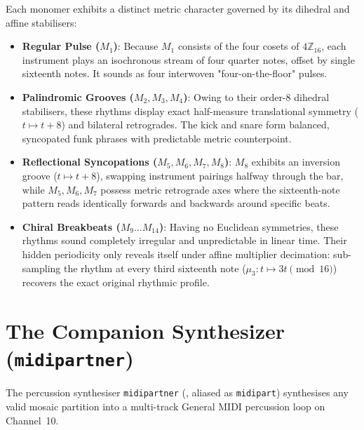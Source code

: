 Each monomer exhibits a distinct metric character governed by its dihedral and affine stabilisers:
\begin{itemize}
    \item \textbf{Regular Pulse ($M_1$)}:
    Because $M_1$ consists of the four cosets of $4\mathbb{Z}_{16}$, each instrument plays an isochronous stream of four quarter notes, offset by single sixteenth notes. It sounds as four interwoven "four-on-the-floor" pulses.
    
    \item \textbf{Palindromic Grooves ($M_2, M_3, M_4$)}:
    Owing to their order-$8$ dihedral stabilisers, these rhythms display exact half-measure translational symmetry ($t \mapsto t + 8$) and bilateral retrogrades. The kick and snare form balanced, syncopated funk phrases with predictable metric counterpoint.
    
    \item \textbf{Reflectional Syncopations ($M_5, M_6, M_7, M_8$)}:
    $M_8$ exhibits an inversion groove ($t \mapsto t + 8$), swapping instrument pairings halfway through the bar, while $M_5, M_6, M_7$ possess metric retrograde axes where the sixteenth-note pattern reads identically forwards and backwards around specific beats.
    
    \item \textbf{Chiral Breakbeats ($M_9 \dots M_{14}$)}:
    Having no Euclidean symmetries, these rhythms sound completely irregular and unpredictable in linear time. Their hidden periodicity only reveals itself under affine multiplier decimation: sub-sampling the rhythm at every third sixteenth note ($\mu_3 \colon t \mapsto 3t \pmod{16}$) recovers the exact original rhythmic profile.
\end{itemize}

\section{The Companion Synthesizer (\texttt{midipartner})}
\label{sec:percussion-synthesizer}

The percussion synthesiser \texttt{midipartner} (, aliased as \texttt{midipart}) synthesises any valid mosaic partition into a multi-track General MIDI percussion loop on Channel~10.

